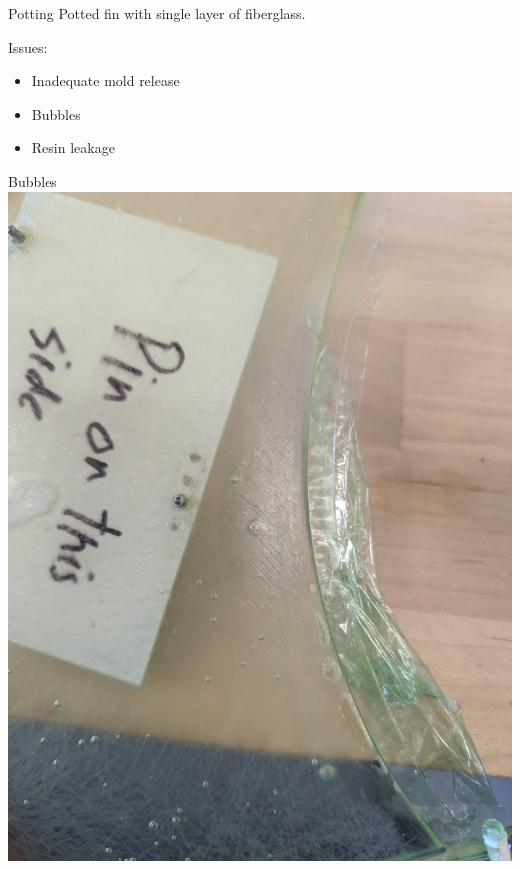 \begin{frame}{Potting}
    Potted fin with single layer of fiberglass.

    Issues:
    \begin{itemize}
        \item Inadequate mold release
        \item Bubbles
        \item Resin leakage
    \end{itemize}
\end{frame}

\begin{frame}{Bubbles}
    \centering
    \includegraphics[height=0.5\textheight,keepaspectratio]{images/sf_charge_pin_bubbles_2.jpg}

\end{frame}

